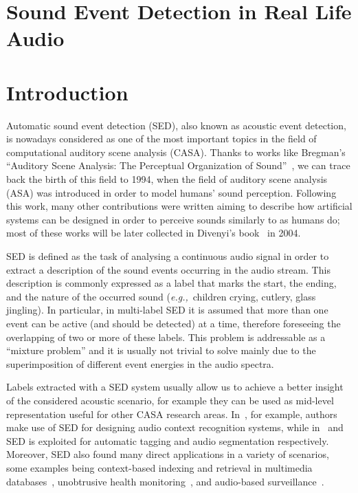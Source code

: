\section{Sound Event Detection in Real Life Audio}

\section{Introduction}
\label{sec:intro}


Automatic sound event detection (SED), also known as acoustic event detection, is nowadays considered as one of the most important topics in the field of computational auditory scene analysis (CASA). Thanks to works like Bregman's ``Auditory Scene Analysis: The Perceptual Organization of Sound''~\cite{bregman1994auditory}, we can trace back the birth of this field to 1994, when the field of auditory scene analysis (ASA) was introduced in order to model humans' sound perception. Following this work, many other contributions were written aiming to describe how artificial systems can be designed in order to perceive sounds similarly to as humans do; most of these works will be later collected in Divenyi's book~\cite{divenyi2004speech} in 2004.

SED is defined as the task of analysing a continuous audio signal in order to extract a description of the sound events occurring in the audio stream. This description is commonly expressed as a label that marks the start, the ending, and the nature of the occurred sound (\emph{e.g.,}\ children crying, cutlery, glass jingling). In particular, in multi-label SED it is assumed that more than one event can be active (and should be detected) at a time, therefore foreseeing the overlapping of two or more of these labels. This problem is addressable as a ``mixture problem'' and it is usually not trivial to solve mainly due to the superimposition of different event energies in the audio spectra.

Labels extracted with a SED system usually allow us to achieve a better insight of the considered acoustic scenario, for example they can be used as mid-level representation useful for other CASA research areas. In~\cite{chu2009environmental, heittola2010audio}, for example, authors make use of SED for designing audio context recognition systems, while in~\cite{shah2012lifelogging} and~\cite{wichern2010segmentation} SED is exploited for automatic tagging and audio segmentation respectively. Moreover, SED also found many direct applications in a variety of scenarios, some examples being context-based indexing and retrieval in multimedia databases~\cite{xu2008audio}, unobtrusive health monitoring~\cite{peng2009healthcare}, and audio-based surveillance~\cite{harma2005automatic, crocco2014surveillance, Principi2016a}.

